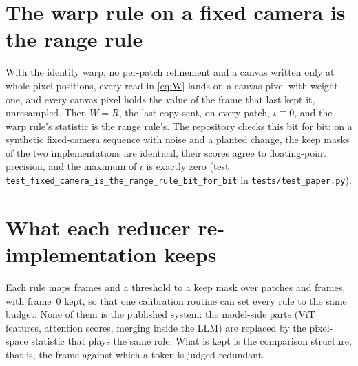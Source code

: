 \section{The warp rule on a fixed camera is the range rule}
\label{app:parity}

With the identity warp, no per-patch refinement and a canvas written only at whole pixel positions, every read in \eqref{eq:W} lands on a canvas pixel with weight one, and every canvas pixel holds the value of the frame that last kept it, unresampled. Then $W = R$, the last copy sent, on every patch, $\iota \equiv 0$, and the warp rule's statistic is the range rule's. The repository checks this bit for bit: on a synthetic fixed-camera sequence with noise and a planted change, the keep masks of the two implementations are identical, their scores agree to floating-point precision, and the maximum of $\iota$ is exactly zero (test \texttt{test\_fixed\_camera\_is\_the\_range\_rule\_bit\_for\_bit} in \texttt{tests/test\_paper.py}).

\section{What each reducer re-implementation keeps}
\label{app:reducers}

Each rule maps frames and a threshold to a keep mask over patches and frames, with frame~0 kept, so that one calibration routine can set every rule to the same budget. None of them is the published system: the model-side parts (ViT features, attention scores, merging inside the LLM) are replaced by the pixel-space statistic that plays the same role. What is kept is the comparison structure, that is, the frame against which a token is judged redundant.

